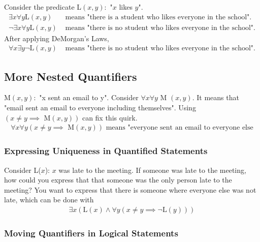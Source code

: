 \noindent Consider the predicate L$(x,y):$ "$x$ likes $y$".
\begin{align*}
  \exists x \forall y \text{L}(x, y)       & \text{ means "there is a student who likes everyone in the school".}  \\
  \lnot \exists x \forall y \text{L}(x, y) & \text{ means "there is no student who likes everyone in the school".}
\end{align*}
After applying DeMorgan's Laws,
\begin{align*}
  \forall x \exists y \lnot \text{L}(x, y) & \text{ means "there is no student who likes everyone in the school".}
\end{align*}

\subsection{More Nested Quantifiers}

M$(x, y):$ "x sent an email to y". Consider $\forall x \forall y$ M $(x, y)$.
It means that "email sent an email to everyone including themselves".
Using $( x \not = y \implies \text{ M}(x, y))$ can fix this quirk.
\begin{align*}
  \forall x \forall y (x \not = y \implies \text{ M}(x, y))
  \text{ means "everyone sent an email to everyone else}
\end{align*}

\subsubsection*{Expressing Uniqueness in Quantified Statements}

Consider L($x$): $x$ was late to the meeting. If someone was late to the meeting,
how could you express that that someone was the only person late to the meeting?
You want to express that there is someone where everyone else was not late, which
can be done with
\begin{align*}
  \exists x (\text{L}(x) \land \forall y (x \not = y \implies \lnot \text{L}(y)))
\end{align*}

\subsubsection*{Moving Quantifiers in Logical Statements}

